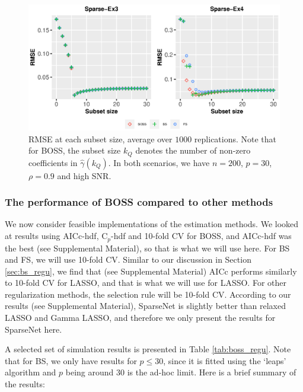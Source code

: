 \begin{figure}[ht!]
	\centering
	\includegraphics[width=\textwidth]{figures/rmse_solpath_lsmethods.eps}
	\caption{RMSE at each subset size, average over $1000$ replications. Note that for BOSS, the subset size $k_Q$ denotes the number of non-zero coefficients in $\hat{\gamma}(k_Q)$. In both scenarios, we have $n=200$, $p=30$, $\rho=0.9$ and high SNR.}
	\label{fig:lossratio_fs_boss_k}
\end{figure}


\subsubsection{The performance of BOSS compared to other methods}
\label{sec:boss_regu}
We now consider feasible implementations of the estimation methods. We looked at results using AICc-hdf, C$_p$-hdf and 10-fold CV for BOSS, and AICc-hdf was the best (see Supplemental Material), so that is what we will use here. For BS and FS, we will use 10-fold CV. Similar to our discussion in Section \ref{sec:bs_regu}, we find that (see Supplemental Material) AICc performs similarly to 10-fold CV for LASSO, and that is what we will use for LASSO. For other regularization methods, the selection rule will be 10-fold CV. According to our results (see Supplemental Material), SparseNet is slightly better than relaxed LASSO and Gamma LASSO, and therefore we only present the results for SparseNet here. 

A selected set of simulation results is presented in Table \ref{tab:boss_regu}. Note that for BS, we only have results for $p\le 30$, since it is fitted using the `leaps' algorithm and $p$ being around $30$ is the ad-hoc limit. Here is a brief summary of the results:




